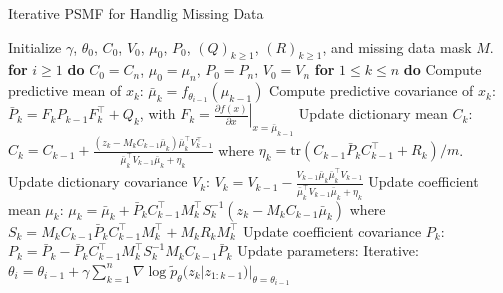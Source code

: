 \documentclass{mldsmsc}
\begin{document}
\begin{algorithm}[h]
\caption{Iterative PSMF for Handlig Missing Data}
\begin{algorithmic}[1]
\State Initialize $\gamma$, $\theta_0$, $C_0$, $V_0$, $\mu_0$, $P_0$, $(Q)_{k \geq 1}$, $(R)_{k \geq 1}$, and missing data mask $M$.
\State \textbf{for} $i \geq 1$ \textbf{do}
\State \hspace{1em} $C_0 = C_n$, $\mu_0 = \mu_n$, $P_0 = P_n$, $V_0 = V_n$
\State \hspace{1em} \textbf{for} $1 \leq k \leq n$ \textbf{do}
\State \hspace{2em} Compute predictive mean of $x_k$:
\State \hspace{3em} $\bar{\mu}_k = f_{\theta_{i-1}}(\mu_{k-1})$
\State \hspace{2em} Compute predictive covariance of $x_k$:
\State \hspace{3em} $\bar{P}_k = F_k P_{k-1} F_k^\top + Q_k$, with $F_k = \left. \frac{\partial f(x)}{\partial x} \right|_{x=\bar{\mu}_{k-1}}$
\State \hspace{2em} Update dictionary mean $C_k$:
\State \hspace{3em} $C_k = C_{k-1} + \frac{(z_k - M_k C_{k-1} \bar{\mu}_k)\bar{\mu}_k^\top V_{k-1}^\top}{\bar{\mu}_k^\top V_{k-1} \bar{\mu}_k + \eta_k}$
\State \hspace{2em} where $\eta_k = \text{tr}(C_{k-1} \bar{P}_k C_{k-1}^\top + R_{k}) / m$.
\State \hspace{2em} Update dictionary covariance $V_k$:
\State \hspace{3em} $V_k = V_{k-1} - \frac{V_{k-1} \bar{\mu}_k \bar{\mu}_k^\top V_{k-1}}{\bar{\mu}_k^\top V_{k-1} \bar{\mu}_k + \eta_k}$
\State \hspace{2em} Update coefficient mean $\mu_k$:
\State \hspace{3em} $\mu_k = \bar{\mu}_k + \bar{P}_k C_{k-1}^\top M_k^\top S_k^{-1} (z_k - M_k C_{k-1} \bar{\mu}_k)$
\State \hspace{3em} where $S_k = M_k C_{k-1} \bar{P}_k C_{k-1}^\top M_k^\top + M_k R_k M_k^\top$
\State \hspace{2em} Update coefficient covariance $P_k$:
\State \hspace{3em} $P_k = \bar{P}_k - \bar{P}_k C_{k-1}^\top M_k^\top S_k^{-1} M_k C_{k-1} \bar{P}_k$
\State \hspace{1em} Update parameters:
\State \hspace{2em} Iterative: $\theta_i = \theta_{i-1} + \gamma \sum_{k=1}^n \nabla \log \tilde{p}_\theta(z_k | z_{1:k-1}) |_{\theta=\theta_{i-1}}$
\end{algorithmic}\label{algo:psmf_missing_data}
\end{algorithm}
\end{document}
